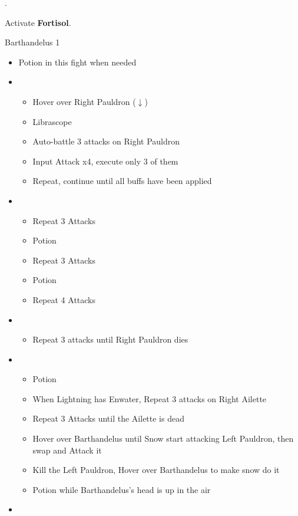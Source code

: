 .

Activate \textbf{Fortisol}.

\begin{battle}{Barthandelus 1}
\begin{itemize}
    \item Potion in this fight when needed
    \item \first
    \begin{itemize}
        \item Hover over Right Pauldron ($\downarrow$)
        \item Librascope
        \item Auto-battle 3 attacks on Right Pauldron
        \item Input Attack x4, execute only 3 of them
        \item Repeat, continue until all buffs have been applied
    \end{itemize}
    \item \sixth
    \begin{itemize}
        \item Repeat 3 Attacks
        \item Potion
        \item Repeat 3 Attacks
        \item Potion
        \item Repeat 4 Attacks
    \end{itemize}
    \item \fifth
    \begin{itemize}
        \item Repeat 3 attacks until Right Pauldron dies
    \end{itemize}
    \item \first
    \begin{itemize}
        \item Potion
        \item When Lightning has Enwater, Repeat 3 attacks on Right Ailette
        \item Repeat 3 Attacks until the Ailette is dead
        \item Hover over Barthandelus until Snow start attacking Left Pauldron, then swap and Attack it
        \item Kill the Left Pauldron, Hover over Barthandelus to make snow do it
        \item Potion while Barthandelus's head is up in the air
    \end{itemize}
    \item \second

\end{itemize}
\end{battle}
